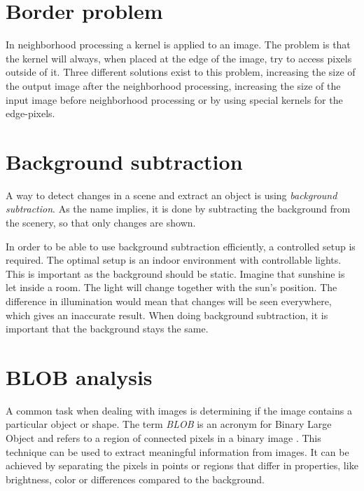 \section{Border problem}
In neighborhood processing a kernel is applied to an image. The problem is that the kernel will always, when placed at the edge of the image, try to access pixels outside of it. Three different solutions exist to this problem, increasing the size of the output image after the neighborhood processing, increasing the size of the input image before neighborhood processing or by using special kernels for the edge-pixels.


\section{Background subtraction}
A way to detect changes in a scene and extract an object is using \textit{background subtraction}. As the name implies, it is done by subtracting the background from the scenery, so that only changes are shown.

In order to be able to use background subtraction efficiently, a controlled setup is required. The optimal setup is an indoor environment with controllable lights. This is important as the background should be static. Imagine that sunshine is let inside a room. The light will change together with the sun's position. The difference in illumination would mean that changes will be seen everywhere, which gives an inaccurate result. When doing background subtraction, it is important that the background stays the same.


\section{BLOB analysis}\label{blob}
A common task when dealing with images is determining if the image contains a particular object or shape. The term \textit{BLOB} is an acronym for Binary Large Object and refers to a region of connected pixels in a binary image \citep{ip_book}. This technique can be used to extract meaningful information from images. It can be achieved by separating the pixels in points or regions that differ in properties, like brightness, color or differences compared to the background.

